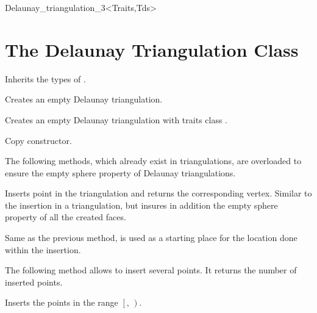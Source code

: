 \begin{ccClassTemplate}{Delaunay_triangulation_3<Traits,Tds>}
\section{The Delaunay Triangulation Class\\
\protect{} }  

\ccDefinition
{}



\ccTypes

Inherits the types of .

\ccCreation
{}

{Creates an empty Delaunay triangulation.}

{Creates an empty Delaunay triangulation with traits class
.}

{Copy constructor.}

\ccModifiers


The following methods, which already exist in triangulations, are
overloaded to ensure the empty sphere property of Delaunay
triangulations.

{Inserts point  in the triangulation and returns the corresponding
 vertex. Similar to the insertion in a triangulation, but insures in
addition the empty sphere property of all the created faces.}

{Same as the previous method,  is used as a starting
place for the location done within the insertion.}

The following method allows to insert several points. It returns the
number of inserted points. 

{Inserts the points in the range $\left[\right.$,
$\left.\right)$. 
}


\end{ccClassTemplate}

